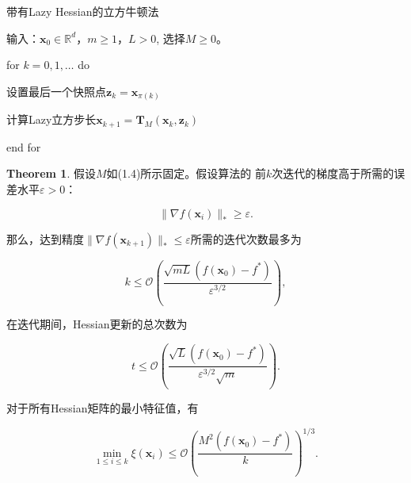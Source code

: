 \documentclass[a4paper,twoside,AutoFakeBold]{article}
\theoremstyle{definition}
\newtheorem{thrm2}{{Theorem}}[section]
\begin{document}
\begin{algorithm}[h]\xiaosi
	\caption{\xiaosi 带有Lazy Hessian的立方牛顿法}\label{alg:1}
	\begin{algorithmic} 
	\STATE 输入：\(\mathbf{x}_0 \in \mathbb{R}^d\)，\(m \geq 1\)，\(L > 0\), 选择\(M \geq 0\)。

	\STATE for \(k = 0, 1, \ldots\) do

	\STATE   设置最后一个快照点\(\mathbf{z}_k = \mathbf{x}_{\pi(k)}\)

	\STATE   计算Lazy立方步长\(\mathbf{x}_{k+1} = \mathbf{T}_M(\mathbf{x}_k, \mathbf{z}_k)\)
		
	\STATE end for

	\end{algorithmic}
\end{algorithm}

\begin{mdframed}

\begin{thrm2}\label{thrm:3.1}
	假设\(M\)如(1.4)所示固定。假设算法的
	前\(k\)次迭代的梯度高于所需的误差水平\(\varepsilon > 0\)：	

\begin{equation}\label{12}
\|\nabla f(\mathbf{x}_i)\|_* \geq \varepsilon. \tag{12}
\end{equation}

那么，达到精度\(\|\nabla f(\mathbf{x}_{k+1})\|_* \leq \varepsilon\)所需的迭代次数最多为

\begin{equation}\label{13}
k \leq \mathcal{O}\left(\frac{\sqrt{mL}(f(\mathbf{x}_0) - f^*)}{\varepsilon^{3/2}}\right), \tag{13}
\end{equation}

在迭代期间，Hessian更新的总次数为

\begin{equation}\label{14}
t \leq \mathcal{O}\left(\frac{\sqrt{L}(f(\mathbf{x}_0) - f^*)}{\varepsilon^{3/2}\sqrt{m}}\right). \tag{14}
\end{equation}

对于所有Hessian矩阵的最小特征值，有

\begin{equation}\label{15}
\min_{1 \leq i \leq k} \xi(\mathbf{x}_i) \leq \mathcal{O}\left(\frac{M^2(f(\mathbf{x}_0) - f^*)}{k}\right)^{1/3}. \tag{15}
\end{equation}

\end{thrm2}

\end{mdframed}
\end{document}
